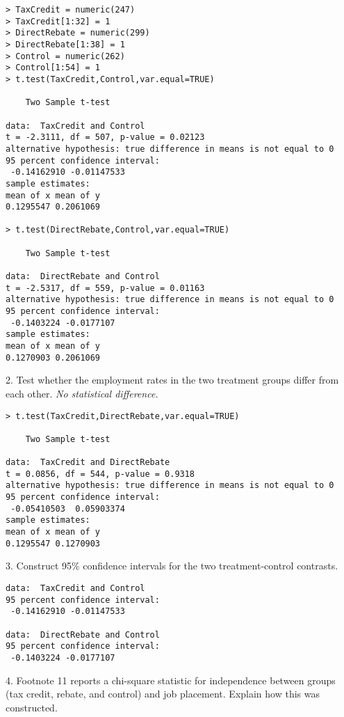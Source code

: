 \documentclass[12pt]{article}
\begin{document}
\begin{Verbatim}[fontsize=\small]
> TaxCredit = numeric(247)
> TaxCredit[1:32] = 1
> DirectRebate = numeric(299)
> DirectRebate[1:38] = 1
> Control = numeric(262)
> Control[1:54] = 1
> t.test(TaxCredit,Control,var.equal=TRUE)

	Two Sample t-test

data:  TaxCredit and Control
t = -2.3111, df = 507, p-value = 0.02123
alternative hypothesis: true difference in means is not equal to 0
95 percent confidence interval:
 -0.14162910 -0.01147533
sample estimates:
mean of x mean of y 
0.1295547 0.2061069 

> t.test(DirectRebate,Control,var.equal=TRUE)

	Two Sample t-test

data:  DirectRebate and Control
t = -2.5317, df = 559, p-value = 0.01163
alternative hypothesis: true difference in means is not equal to 0
95 percent confidence interval:
 -0.1403224 -0.0177107
sample estimates:
mean of x mean of y 
0.1270903 0.2061069 
\end{Verbatim}

2. Test whether the employment rates in the two treatment groups differ
from each other.
{\it No statistical difference.}

\begin{Verbatim}[fontsize=\small]
> t.test(TaxCredit,DirectRebate,var.equal=TRUE)

	Two Sample t-test

data:  TaxCredit and DirectRebate
t = 0.0856, df = 544, p-value = 0.9318
alternative hypothesis: true difference in means is not equal to 0
95 percent confidence interval:
 -0.05410503  0.05903374
sample estimates:
mean of x mean of y 
0.1295547 0.1270903 
\end{Verbatim}

3. Construct 95\% confidence intervals for the two treatment-control contrasts.

\begin{Verbatim}[fontsize=\small]
data:  TaxCredit and Control
95 percent confidence interval:
 -0.14162910 -0.01147533

data:  DirectRebate and Control
95 percent confidence interval:
 -0.1403224 -0.0177107
\end{Verbatim}

4. Footnote 11 reports a chi-square statistic for independence between groups
(tax credit, rebate, and control) and job placement.
Explain how this was constructed.
\end{document}
